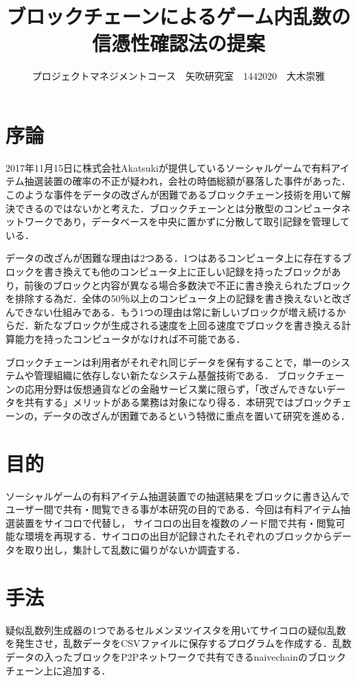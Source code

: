 \documentclass[uplatex,twocolumn,dvipdfmx]{jsarticle}
\title{\vspace{-5mm}\fontsize{14pt}{0pt}\selectfont ブロックチェーンによるゲーム内乱数の信憑性確認法の提案}
\author{\normalsize プロジェクトマネジメントコース　矢吹研究室　1442020　大木崇雅}
\date{}
\begin{document}
\fontsize{10.5pt}{\baselineskip}\selectfont
\maketitle





\section{序論}



2017年11月15日に株式会社Akatsukiが提供しているソーシャルゲームで有料アイテム抽選装置の確率の不正が疑われ，会社の時価総額が暴落した事件があった．このような事件をデータの改ざんが困難であるブロックチェーン技術を用いて解決できるのではないかと考えた．ブロックチェーンとは分散型のコンピュータネットワークであり，データベースを中央に置かずに分散して取引記録を管理している\cite{a}．


データの改ざんが困難な理由は2つある．1つはあるコンピュータ上に存在するブロックを書き換えても他のコンピュータ上に正しい記録を持ったブロックがあり，前後のブロックと内容が異なる場合多数決で不正に書き換えられたブロックを排除する為だ．全体の50％以上のコンピュータ上の記録を書き換えないと改ざんできない仕組みである\cite{c}．もう1つの理由は常に新しいブロックが増え続けるからだ．新たなブロックが生成される速度を上回る速度でブロックを書き換える計算能力を持ったコンピュータがなければ不可能である．


ブロックチェーンは利用者がそれぞれ同じデータを保有することで，単一のシステムや管理組織に依存しない新たなシステム基盤技術である．
ブロックチェーンの応用分野は仮想通貨などの金融サービス業に限らず，「改ざんできないデータを共有する」メリットがある業務は対象になり得る．本研究ではブロックチェーンの，データの改ざんが困難であるという特徴に重点を置いて研究を進める．


\section{目的}
ソーシャルゲームの有料アイテム抽選装置での抽選結果をブロックに書き込んでユーザー間で共有・閲覧できる事が本研究の目的である．今回は有料アイテム抽選装置をサイコロで代替し，
サイコロの出目を複数のノード間で共有・閲覧可能な環境を再現する．サイコロの出目が記録されたそれぞれのブロックからデータを取り出し，集計して乱数に偏りがないか調査する．

\section{手法}
疑似乱数列生成器の1つであるセルメンヌツイスタを用いてサイコロの疑似乱数を発生させ，乱数データをCSVファイルに保存するプログラムを作成する．乱数データの入ったブロックをP2Pネットワークで共有できるnaivechainのブロックチェーン上に追加する．
\end{document}
